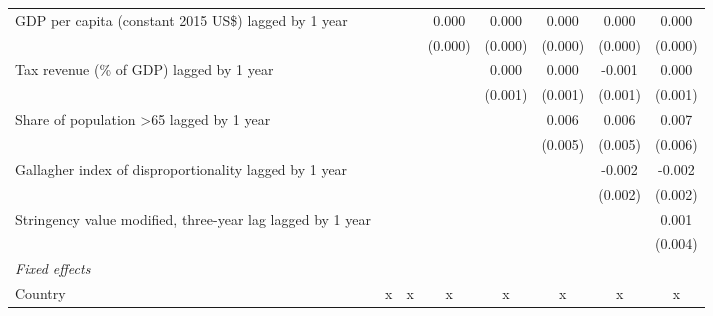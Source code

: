 \begin{tabular}{lccccccc}
   GDP per capita (constant 2015 US\$) lagged by 1 year                                                        &         &              & 0.000   & 0.000         & 0.000   & 0.000   & 0.000\\   
                                                                                                               &         &              & (0.000) & (0.000)       & (0.000) & (0.000) & (0.000)\\   
   Tax revenue (\% of GDP) lagged by 1 year                                                                    &         &              &         & 0.000         & 0.000   & -0.001  & 0.000\\   
                                                                                                               &         &              &         & (0.001)       & (0.001) & (0.001) & (0.001)\\   
   Share of population >65 lagged by 1 year                                                                    &         &              &         &               & 0.006   & 0.006   & 0.007\\   
                                                                                                               &         &              &         &               & (0.005) & (0.005) & (0.006)\\   
   Gallagher index of disproportionality lagged by 1 year                                                      &         &              &         &               &         & -0.002  & -0.002\\   
                                                                                                               &         &              &         &               &         & (0.002) & (0.002)\\   
   Stringency value modified, three-year lag lagged by 1 year                                                  &         &              &         &               &         &         & 0.001\\   
                                                                                                               &         &              &         &               &         &         & (0.004)\\   
   \emph{Fixed effects}\\
   Country                                                                                                     & x       & x            & x       & x             & x       & x       & x\\  

\end{tabular}

